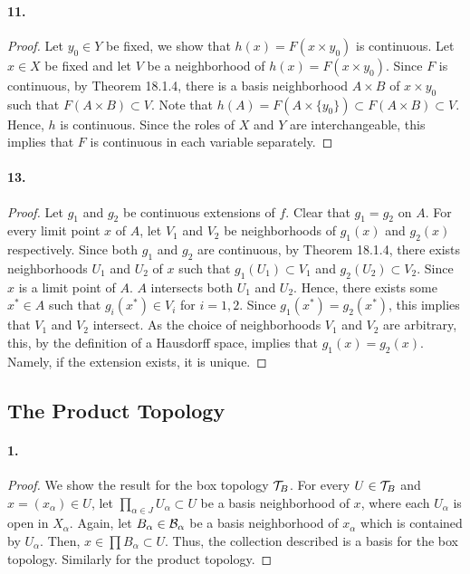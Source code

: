   \paragraph{11.}
  \begin{proof}
    Let $y_0\in Y$ be fixed, we show that $h(x)=F(x\times y_0)$ is continuous.
    Let $x\in X$ be fixed and let $V$ be a neighborhood of $h(x)=F(x\times 
    y_0)$. Since $F$ is continuous, by Theorem 18.1.4, there is a basis 
    neighborhood $A\times B$ of $x\times y_0$ such that $F(A\times B)\subset 
    V$. Note that $h(A)=F(A\times\{y_0\})\subset F(A\times B)\subset V$. 
    Hence, $h$ is continuous. Since the roles of $X$ and $Y$ are 
    interchangeable, this implies that $F$ is continuous in each variable
    separately.
  \end{proof}
  
  \paragraph{13.}
  \begin{proof}
    Let $g_1$ and $g_2$ be continuous extensions of $f$. Clear that $g_1=g_2$ 
    on $A$. For every limit point $x$ of $A$, let $V_1$ and $V_2$ be 
    neighborhoods of $g_1(x)$ and $g_2(x)$ respectively. Since both $g_1$ and 
    $g_2$ are continuous, by Theorem 18.1.4, there exists neighborhoods $U_1$ 
    and $U_2$ of $x$ such that $g_1(U_1)\subset V_1$ and $g_2(U_2)\subset V_2$. 
    Since $x$ is a limit point of $A$. $A$ intersects both $U_1$ and $U_2$. 
    Hence, there exists some $x^*\in A$ such that $g_i(x^*)\in V_i$ for 
    $i=1,2$. Since $g_1(x^*)=g_2(x^*)$, this implies that $V_1$ and $V_2$ 
    intersect. As the choice of neighborhoods $V_1$ and $V_2$ are arbitrary, 
    this, by the definition of a Hausdorff space, implies that $g_1(x)=g_2(x)$.
    Namely, if the extension exists, it is unique.
  \end{proof}
\subsection{The Product Topology}
  \paragraph{1.}
  \begin{proof}
    We show the result for the box topology $\mathcal{T}_B$. For every $U
    \in\mathcal{T}_B$ and $x=(x_\alpha)\in U$, let $\prod_{\alpha\in J}U_\alpha 
    \subset U$ be a basis neighborhood of $x$, where each $U_\alpha$ is open in 
    $X_\alpha$. Again, let $B_\alpha\in\mathcal{B}_\alpha$ be a basis neighborhood
    of $x_\alpha$ which is contained by $U_\alpha$. Then, $x\in\prod B_\alpha
    \subset U$. Thus, the collection described is a basis for the box topology.
    Similarly for the product topology.
  \end{proof}
  

